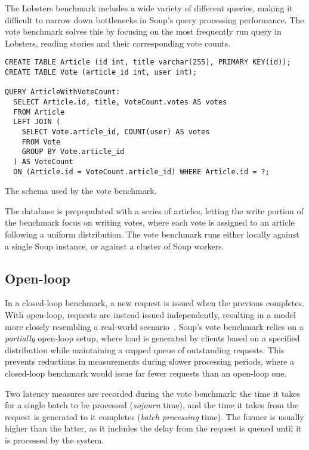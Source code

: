 The Lobsters benchmark includes a wide variety of different queries, making it
difficult to narrow down bottlenecks in Soup's query processing performance. The
vote benchmark solves this by focusing on the most frequently run query in
Lobsters, reading stories and their corresponding vote counts.

\begin{listing}[H]
  \begin{verbatim}
CREATE TABLE Article (id int, title varchar(255), PRIMARY KEY(id));
CREATE TABLE Vote (article_id int, user int);

QUERY ArticleWithVoteCount:
  SELECT Article.id, title, VoteCount.votes AS votes
  FROM Article
  LEFT JOIN (
    SELECT Vote.article_id, COUNT(user) AS votes
    FROM Vote
    GROUP BY Vote.article_id
  ) AS VoteCount
  ON (Article.id = VoteCount.article_id) WHERE Article.id = ?;
  \end{verbatim}

  \caption{The schema used by the vote benchmark.}\label{lst:vote}
\end{listing}

The database is prepopulated with a series of articles, letting the write
portion of the benchmark focus on writing votes, where each vote is assigned to
an article following a uniform distribution. The vote benchmark runs either
locally against a single Soup instance, or against a cluster of Soup workers.

\subsection{Open-loop}\label{sec:vote-open-loop}

In a closed-loop benchmark, a new request is issued when the previous completes.
With open-loop, requests are instead issued independently, resulting in a model
more closely resembling a real-world scenario~\cite{open-loop}. Soup's vote
benchmark relies on a \textit{partially} open-loop setup, where load is
generated by clients based on a specified distribution while maintaining a
capped queue of outstanding requests. This prevents reductions in measurements
during slower processing periods, where a closed-loop benchmark would issue far
fewer requests than an open-loop one.

Two latency measures are recorded during the vote benchmark: the time it takes
for a single batch to be processed (\textit{sojourn} time), and the time it
takes from the request is generated to it completes (\textit{batch processing}
time). The former is usually higher than the latter, as it includes the delay
from the request is queued until it is processed by the system.

